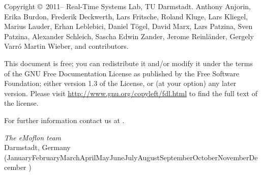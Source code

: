 \newcommand{\monthword}[1]{\ifcase#1\or January\or February\or March\or April\or May\or June\or July\or August\or September\or October\or November\or December\fi}
\begin{small} 
Copyright \copyright~2011--\the\year{} Real-Time Systems Lab, TU Darmstadt.
Anthony Anjorin, Erika Burdon, Frederik Deckwerth, Lars Fritsche, Roland Kluge, Lars Kliegel, Marius Lauder,
Erhan Leblebici, Daniel Tögel, David Marx, Lars Patzina, Sven Patzina, Alexander Schleich, Sascha Edwin Zander, Jerome Reinländer, Gergely Varró Martin Wieber, and contributors.

This document is free; you can redistribute it and/or modify it under the terms of the GNU Free Documentation License as published by the Free Software Foundation; either version 1.3 of the License, or (at your option) any later version.
Please visit \href{http://www.gnu.org/copyleft/fdl.html}{http://www.gnu.org/copyleft/fdl.html} to find the full text of the license.
 
For further information contact us at \eMoflonContact.
  
\vskip3cm
\textit{The eMoflon team}\\
Darmstadt, Germany (\monthword{\month} \the\year)
\end{small}